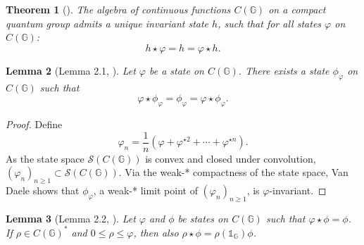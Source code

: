 \documentclass[12pt]{amsart}
\newtheorem{theorem}{Theorem}[section]
\newtheorem{lemma}[theorem]{Lemma}
\theoremstyle{remark}
\theoremstyle{remark}
\begin{document}
\begin{theorem}[\cite{van,wo3}]\label{THQIH}
The algebra of continuous functions $C(\mathbb{G})$ on a compact quantum group admits a unique invariant state $h$, such that for all states $\varphi$ on $C(\mathbb{G})$:
$$h\star \varphi=h=\varphi\star h.$$
\end{theorem}
\begin{lemma}[Lemma 2.1, \cite{van}]\label{van2.1}
Let $\varphi$ be a state on $C(\mathbb{G})$. There exists a state $\phi_{\varphi}$ on $C(\mathbb{G})$ such that
$$\varphi\star\phi_{\varphi}=\phi_{\varphi}=\varphi\star\phi_{\varphi}.$$
\end{lemma}
\begin{proof}
  Define
  $$\varphi_n=\frac{1}{n}(\varphi+\varphi^{\star 2}+\cdots+\varphi^{\star n}).$$
  As the state space $\mathcal{S}(C(\mathbb{G}))$ is convex and closed under convolution, $(\varphi_n)_{n\geq 1}\subset\mathcal{S}(C(\mathbb{G}))$. Via the weak-* compactness of the state space, Van Daele shows that $\phi_{\varphi}$, a weak-* limit point of $(\varphi_n)_{n\geq 1}$, is $\varphi$-invariant.
\end{proof}
\begin{lemma}[Lemma 2.2, \cite{van}]\label{van2.2}
  Let $\varphi$ and $\phi$ be states on $C(\mathbb{G})$ such that $\varphi\star\phi=\phi$. If $\rho\in C(\mathbb{G})^*$ and $0\leq \rho\leq \varphi$, then also $\rho\star\phi=\rho(\mathds{1}_{\mathbb{G}})\phi$.
\end{lemma}
\end{document}
